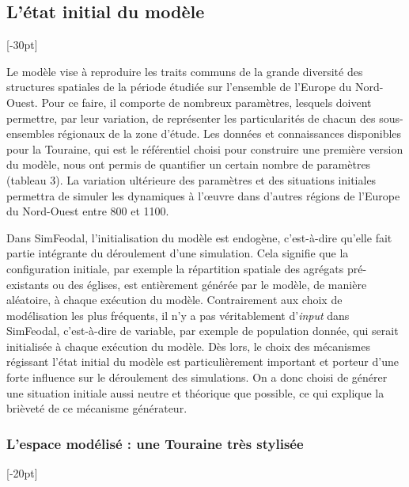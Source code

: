 \clearpage
\subsection{L'état initial du modèle}[-30pt]

Le modèle vise à reproduire les traits communs de la grande diversité des structures spatiales de la période étudiée sur l'ensemble de l'Europe du Nord-Ouest.
Pour ce faire, il comporte de nombreux paramètres, lesquels doivent permettre, par leur variation, de représenter les particularités de chacun des sous-ensembles régionaux de la zone d'étude.
Les données et connaissances disponibles pour la Touraine, qui est le référentiel choisi pour construire une première version du modèle, nous ont permis de quantifier un certain nombre de paramètres (tableau 3).
La variation ultérieure des paramètres et des situations initiales permettra de simuler les dynamiques à l'œuvre dans d'autres régions de l'Europe du Nord-Ouest entre 800 et 1100.

{\blueroman
	Dans SimFeodal, l'initialisation du modèle est endogène, c'est-à-dire qu'elle fait partie intégrante du déroulement d'une simulation.
	Cela signifie que la configuration initiale, par exemple la répartition spatiale des agrégats pré-existants ou des églises, est entièrement générée par le modèle, de manière aléatoire, à chaque exécution du modèle.
	Contrairement aux choix de modélisation les plus fréquents, il n'y a pas véritablement d'\og{}\textit{input} \fg{} dans SimFeodal, c'est-à-dire de variable, par exemple de population donnée, qui serait initialisée à chaque exécution du modèle.
	Dès lors, le choix des mécanismes régissant l'état initial du modèle est particulièrement important et porteur d'une forte influence sur le déroulement des simulations.
	On a donc choisi de générer une situation initiale aussi neutre et théorique que possible, ce qui explique la brièveté de ce mécanisme générateur.
}

\subsubsection{L'espace modélisé : une Touraine très stylisée}[-20pt]

